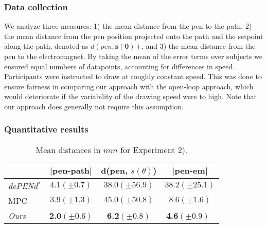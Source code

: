 \subsubsection{Data collection}
We analyze three measures: 
1) the mean distance from the pen to the path, 2) the mean distance from the pen position projected onto the path and the setpoint along the path, denoted as $d(pen, \mathbf{s(\theta)})$, and 3) the mean distance from the pen to the electromagnet. 
By taking the mean of the error terms over subjects we ensured equal numbers of datapoints, accounting for differences in speed. 
Participants were instructed to draw at roughly constant speed.
This was done to ensure fairness in comparing our approach with the open-loop approach, which would deteriorate if the variability of the drawing speed were to high.
Note that our approach does generally not require this assumption.
%


\subsubsection{Quantitative results}

\begin{table}[!t]
    \centering
    \caption{Mean distances in $mm$ for Experiment 2). }
    \begin{tabular}{l|ccc}
         &|pen-path|& d(pen, $s(\theta)$) & |pen-em| \\
         \midrule
         \emph{dePENd$^{*}$} & $4.1(\pm 0.7)$ & $38.0(\pm 56.9)$  &$38.2(\pm 25.1)$ \\ 
         MPC & $3.9(\pm 1.3)$& $45.0(\pm 50.8)$ & $8.6(\pm 1.6)$ \\ 
         \textit{Ours} & \textbf{2.0}$(\pm 0.6 )$& \textbf{6.2}$(\pm 0.8)$ & \textbf{4.6}$(\pm 0.9)$\ 
    \end{tabular}
    \label{tab:strategy_results}
\end{table}

